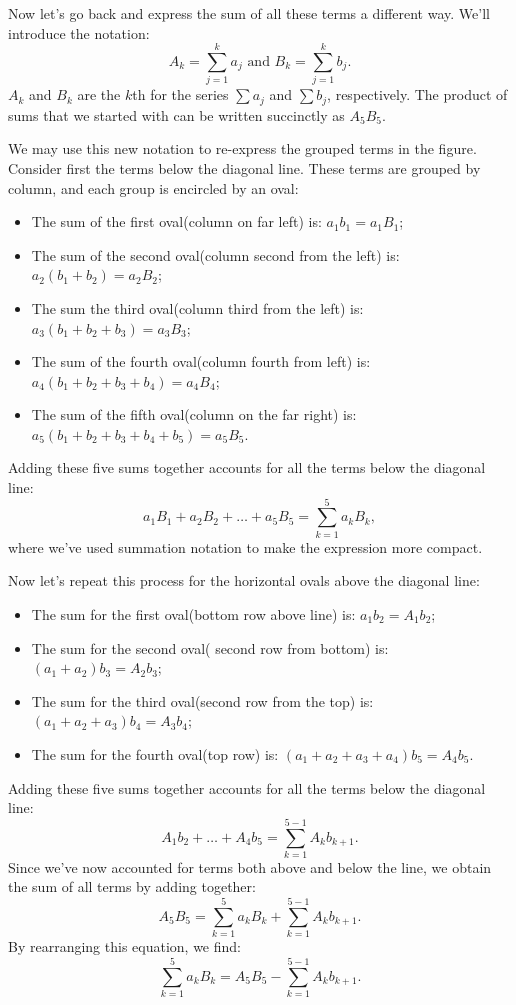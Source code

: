 Now let's go back and express the sum of all these terms a different way. We'll introduce the notation:
\[ A_{k}= \sum_{j=1}^{k}a_{j} \text{ and } B_{k}= \sum_{j=1}^{k}b_{j}. \]
$A_k$ and $B_k$ are the $k$th  for the series $\sum a_j$ and $\sum b_j$, respectively.
The product of sums that we started with can be written succinctly as $A_{5}B_{5}$. 

We may use this new notation to 
re-express the grouped terms in the figure. 
Consider first the terms below the diagonal line. These terms are grouped by column, and each group is encircled by an oval:
\begin{itemize}
\item
The sum of the first oval(column on far left) is: $a_{1}b_{1}= a_{1}B_{1}$;
 \item
The sum of the second oval(column second from the left) is: $a_{2}\left ( b_{1}+b_{2} \right )= a_{2}B_{2}$;
\item
The sum the third oval(column third from the left) is: $a_{3}\left ( b_{1}+b_{2}+b_{3} \right )= a_{3}B_{3}$;
\item
The sum of the fourth oval(column fourth from left) is: $a_{4}\left ( b_{1}+b_{2}+b_{3}+b_{4} \right )= a_{4}B_{4}$;
\item 
The sum of the fifth oval(column on the far right) is: $a_{5}\left (b _{1}+b_{2}+b_{3}+b_{4}+b_{5} \right )=a _{5}B_{5}$.
\end{itemize}
Adding these five sums together accounts for all the terms below the diagonal line:
\[ a_1B_1 + a_2B_2 + \ldots + a_5B_5 = \sum_{k=1}^{5}a_kB_k,\]
where we've used summation notation to make the expression more compact.

Now let's repeat this process for the horizontal ovals above the diagonal line:
\begin{itemize}
\item
The sum for the first oval(bottom row above line) is: $a_{1}b_{2}= A_{1}b_{2}$;
\item
The sum for the second oval( second row from bottom) is: $\left ( a_{1}+a_{2} \right)b_{3}= A_{2}b_{3}$;
\item
The sum for the third oval(second row from the top) is: $\left ( a_{1}+a_{2}+a_{3} \right )b_{4}= A_{3}b_{4}$;
\item
The sum for the fourth oval(top row) is: $\left ( a_{1}+a_{2}+a_{3}+a_{4} \right)b_{5}= A_{4}b_{5}$.
\end{itemize}
Adding these five sums together accounts for all the terms below the diagonal line:
\[ A_1b_2 +  \ldots + A_4b_5 = \sum_{k=1}^{5-1}A_kb_{k+1}.\]
Since we've now accounted for terms both above and below the line, we obtain the sum of all terms by adding together:
\[ A_{5}B_{5}= \sum_{k=1}^{5}a_{k}B_{k}+\sum_{k=1}^{5-1}A_{k}b_{k+1}. \]
By rearranging this equation, we find:
\[ \sum_{k=1}^{5}a_{k}B_{k}= A_{5}B_{5}-\sum_{k=1}^{5-1}A_{k}b_{k+1}. \]

